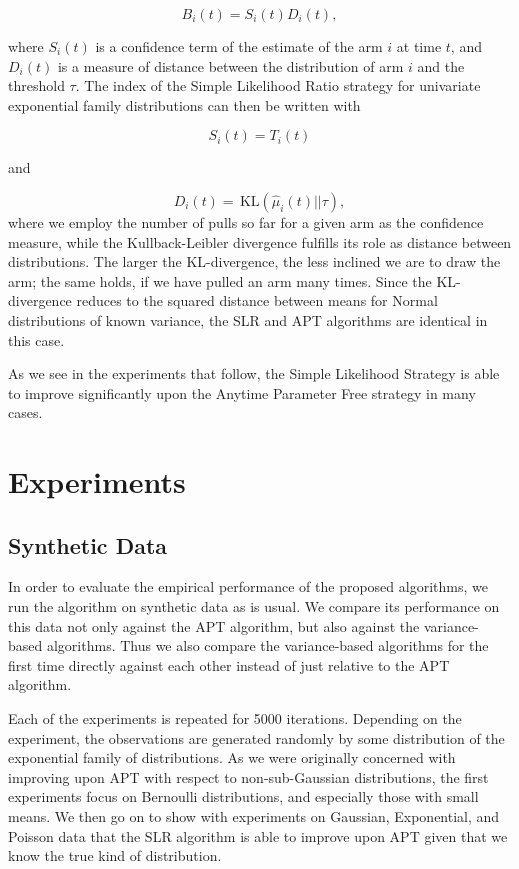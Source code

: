 \documentclass[12pt,]{article}
\newcommand{\KL}{\,\text{KL}}
\begin{document}
\[
B_i(t) = S_i(t) D_i(t),
\]

where \(S_i(t)\) is a confidence term of the estimate of the arm \(i\)
at time \(t\), and \(D_i(t)\) is a measure of distance between the
distribution of arm \(i\) and the threshold \(\tau\). The index of the
Simple Likelihood Ratio strategy for univariate exponential family
distributions can then be written with

\[
S_i(t) = T_i(t)
\]

and

\[
D_i(t) = \KL(\hat{\mu}_i(t)||\tau),
\] where we employ the number of pulls so far for a given arm as the
confidence measure, while the Kullback-Leibler divergence fulfills its
role as distance between distributions. The larger the KL-divergence,
the less inclined we are to draw the arm; the same holds, if we have
pulled an arm many times. Since the KL-divergence reduces to the squared
distance between means for Normal distributions of known variance, the
SLR and APT algorithms are identical in this case.

As we see in the experiments that follow, the Simple Likelihood Strategy
is able to improve significantly upon the Anytime Parameter Free
strategy in many cases.

\section{\texorpdfstring{Experiments
\label{chap:Experiments}}{Experiments }}\label{experiments}

\subsection{\texorpdfstring{Synthetic Data
\label{sec:SyntheticData}}{Synthetic Data }}\label{synthetic-data}

In order to evaluate the empirical performance of the proposed
algorithms, we run the algorithm on synthetic data as is usual. We
compare its performance on this data not only against the APT algorithm,
but also against the variance-based algorithms. Thus we also compare the
variance-based algorithms for the first time directly against each other
instead of just relative to the APT algorithm.

Each of the experiments is repeated for 5000 iterations. Depending on
the experiment, the observations are generated randomly by some
distribution of the exponential family of distributions. As we were
originally concerned with improving upon APT with respect to
non-sub-Gaussian distributions, the first experiments focus on Bernoulli
distributions, and especially those with small means. We then go on to
show with experiments on Gaussian, Exponential, and Poisson data that
the SLR algorithm is able to improve upon APT given that we know the
true kind of distribution.
\end{document}
